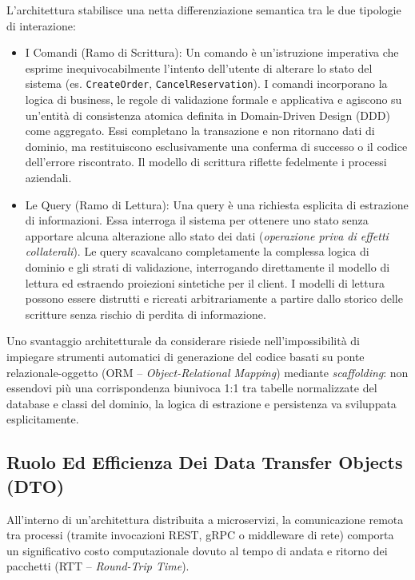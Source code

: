 \documentclass[11pt, a4paper]{article}
\begin{document}
L'architettura stabilisce una netta differenziazione semantica tra le due tipologie di interazione:
\begin{itemize}
    \item I Comandi (Ramo di Scrittura):
    Un comando è un'istruzione imperativa che esprime inequivocabilmente l'intento dell'utente di alterare lo stato del sistema (es. \texttt{CreateOrder}, \texttt{CancelReservation}). I comandi incorporano la logica di business, le regole di validazione formale e applicativa e agiscono su un'entità di consistenza atomica definita in Domain-Driven Design (DDD) come aggregato. Essi completano la transazione e non ritornano dati di dominio, ma restituiscono esclusivamente una conferma di successo o il codice dell'errore riscontrato. Il modello di scrittura riflette fedelmente i processi aziendali.

    \item Le Query (Ramo di Lettura):
    Una query è una richiesta esplicita di estrazione di informazioni. Essa interroga il sistema per ottenere uno stato senza apportare alcuna alterazione allo stato dei dati (\emph{operazione priva di effetti collaterali}). Le query scavalcano completamente la complessa logica di dominio e gli strati di validazione, interrogando direttamente il modello di lettura ed estraendo proiezioni sintetiche per il client. I modelli di lettura possono essere distrutti e ricreati arbitrariamente a partire dallo storico delle scritture senza rischio di perdita di informazione.
\end{itemize}

Uno svantaggio architetturale da considerare risiede nell'impossibilità di impiegare strumenti automatici di generazione del codice basati su ponte relazionale-oggetto (ORM -- \emph{Object-Relational Mapping}) mediante \emph{scaffolding}: non essendovi più una corrispondenza biunivoca 1:1 tra tabelle normalizzate del database e classi del dominio, la logica di estrazione e persistenza va sviluppata esplicitamente.

\subsection{Ruolo Ed Efficienza Dei Data Transfer Objects (DTO)}

All'interno di un'architettura distribuita a microservizi, la comunicazione remota tra processi (tramite invocazioni REST, gRPC o middleware di rete) comporta un significativo costo computazionale dovuto al tempo di andata e ritorno dei pacchetti (RTT -- \emph{Round-Trip Time}).
\end{document}
